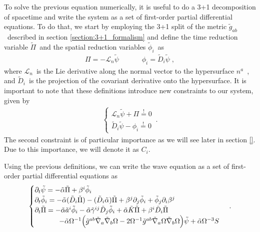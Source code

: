 To solve the previous equation numerically, it is useful to do a 3+1 decomposition of spacetime and write the system as a set of first-order partial differential equations. To do that, we start by employing the 3+1 split of the metric $\tilde{g}_{ab}$~described in section \ref{section:3+1_formalism} and define the time reduction variable $\tilde{\Pi}$~and the spatial reduction variables $\tilde{\phi}_i$~as
%
\begin{align}
    \Pi = - \mathcal{L}_n \tilde{\psi} \;  \quad \quad \quad \phi_i = \tilde{D}_i \tilde{\psi} \; ,
\end{align}
%
where $\mathcal{L}_n$~is the Lie derivative along the normal vector to the hypersurface $n^a$~, and $\tilde{D}_i$~is the projection of the covariant derivative onto the hypersurface. It is important to note that these definitions introduce new constraints to our system, given by
%
\begin{align}
    \begin{cases}
        \mathcal{L}_n \tilde{\psi} + \Pi \overset{!}{=} 0 \\
        \tilde{D}_i \tilde{\psi} - \phi_i \overset{!}{=} 0
    \end{cases}\,.
\end{align}
%
The second constraint is of particular importance as we will see later in section \ref{}. Due to this importance, we will denote it as $C_i$.

Using the previous definitions, we can write the wave equation as a set of first-order partial differential equations as
%
\begin{align}
    \begin{cases}
        \partial_t \tilde{\psi} = - \tilde{\alpha} \tilde{\Pi} + \beta^i \tilde{\phi}_i \\
        \partial_t \tilde{\phi}_i = - \tilde{\alpha} (\tilde{D}_i \tilde{\Pi}) - (\tilde{D}_i \tilde{\alpha}) \tilde{\Pi} + \beta^j \partial_j \tilde{\phi}_i + \tilde{\phi}_j \partial_i \beta^j \\
        \partial_t \tilde{\Pi} = - \tilde{\alpha} \tilde{a}^i \tilde{\phi}_i - \tilde{\alpha} \tilde{\gamma}^{ij} \tilde{D}_j \tilde{\phi}_i + \tilde{\alpha} \tilde{K} \tilde{\Pi} + \beta^i \tilde{D}_i \tilde{\Pi} \\
        \hspace{3.5em} - \tilde{\alpha} \Omega^{-1} \Big( \tilde{g}^{ab} \tilde{\nabla}_a \tilde{\nabla}_b \Omega - 2 \Omega^{-1} \tilde{g}^{ab} \tilde{\nabla}_a \Omega \tilde{\nabla}_b \Omega \Big) \tilde{\psi} + \tilde{\alpha} \Omega^{-3} S
    \end{cases}\,.
\end{align}

